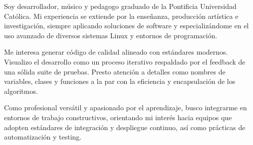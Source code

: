 

\begin{cvparagraph}

    Soy desarrollador, músico y pedagogo graduado de la Pontificia Universidad
    Católica. Mi experiencia se extiende por la enseñanza, producción artística
    e investigación, siempre aplicando soluciones de software y especializándome
    en el uso avanzado de diversos sistemas Linux y entornos de programación.

    Me interesa generar código de calidad alineado con estándares modernos.
    Visualizo el desarrollo como un proceso iterativo respaldado por el feedback
    de una sólida suite de pruebas. Presto atención a detalles como nombres de
    variables, clases y funciones a la par con la eficiencia y encapsulación de
    los algoritmos.

    Como profesional versátil y apasionado por el aprendizaje, busco integrarme
    en entornos de trabajo constructivos, orientando mi interés hacia equipos
    que adopten estándares de integración y despliegue continuo, así como
    prácticas de automatización y testing.

\end{cvparagraph}

